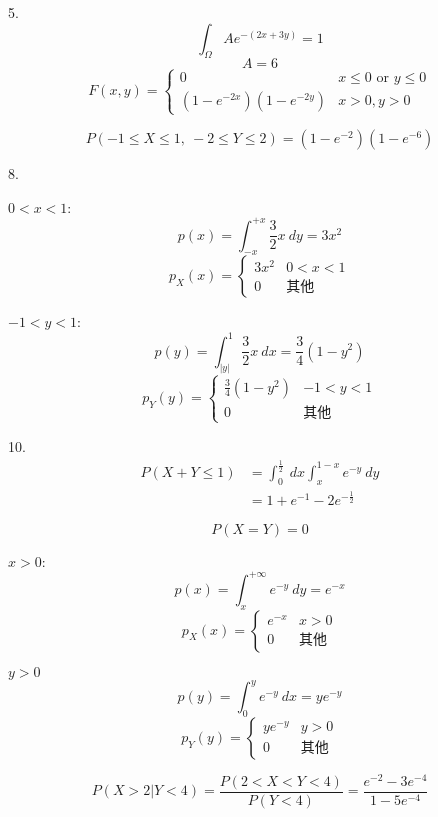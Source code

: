 \documentclass[10pt, a4paper,twocolumn]{article}
\begin{document}
5.
$$\int_{\Omega}Ae^{-(2x + 3y)} = 1$$
$$A = 6$$
$$F(x, y) = \begin{cases}
    0  & x \leqslant 0 \text{ or } y \leqslant 0 \\
    (1 - e^{-2x})(1 - e^{-2y}) & x > 0, y > 0
\end{cases}$$

$$P(-1 \leqslant X \leqslant 1,\ -2\leqslant Y \leqslant 2) = (1 - e^{-2})(1 - e^{-6})$$

8.

$0 < x < 1$: 
$$p(x) = \int_{-x}^{+x}\frac{3}{2}x\ dy = 3x^2$$
$$p_X(x) = \begin{cases}
    3x^2 & 0 < x < 1 \\
    0 & \text{其他}
\end{cases}$$

$-1 < y < 1$: 
$$p(y) = \int_{|y|}^1 \frac{3}{2}x\ dx = \frac{3}{4}(1 - y^2)$$
$$p_Y(y) = \begin{cases}
    \frac{3}{4}(1 - y^2) & -1 < y < 1  \\
    0 & \text{其他}
\end{cases}$$

10. 
\begin{align*}
    P(X + Y \leqslant 1) &= \int_0^{\frac{1}{2}}\ dx\int_x^{1 - x} e^{-y}\ dy \\
        &= 1 + e^{-1} - 2e^{-\frac{1}{2}}
\end{align*}

$$P(X = Y) = 0$$

$x > 0$:
$$p(x) = \int_{x}^{+\infty}e^{-y}\ dy = e^{-x}$$
$$p_X(x) = \begin{cases}
    e^{-x} & x > 0 \\
    0 & \text{其他}
\end{cases}$$

$y > 0$ 
$$p(y) = \int_{0}^{y}e^{-y}\ dx = ye^{-y}$$
$$p_Y(y) = \begin{cases}
    ye^{-y} & y > 0 \\
    0 & \text{其他}
\end{cases}$$

$$P(X > 2 | Y < 4) = \frac{P(2 < X < Y < 4)}{P(Y < 4)} = \frac{e^{-2} - 3e^{-4}}{1 - 5e^{-4}}$$

$$$$
\end{document}
